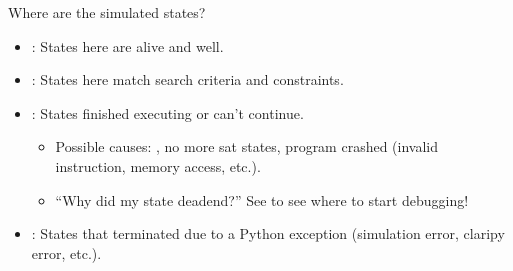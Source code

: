 \documentclass[xcolor={dvipsnames}]{beamer}
\begin{document}
\begin{frame}[fragile]{}
    Where are the simulated states?
    \begin{itemize}
        \item<2-> : States here are alive and well.
        \item<2-> : States here match search criteria and constraints.
        \item<3-> : States finished executing or can't continue.
              \begin{itemize}
                  \item Possible causes: , no more sat states, program crashed (invalid instruction, memory access, etc.).
                  \item ``Why did my state deadend?'' See  to see where to start debugging!
              \end{itemize}
        \item<4-> : States that terminated due to a Python exception (simulation error, claripy error, etc.).
    \end{itemize}

\end{frame}
\end{document}
